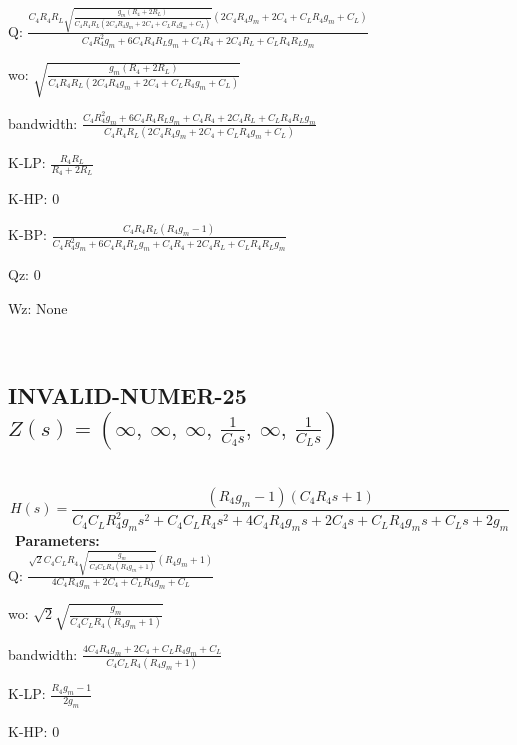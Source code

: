 \documentclass{article}
\begin{document}
Q: $\frac{C_{4} R_{4} R_{L} \sqrt{\frac{g_{m} \left(R_{4} + 2 R_{L}\right)}{C_{4} R_{4} R_{L} \left(2 C_{4} R_{4} g_{m} + 2 C_{4} + C_{L} R_{4} g_{m} + C_{L}\right)}} \left(2 C_{4} R_{4} g_{m} + 2 C_{4} + C_{L} R_{4} g_{m} + C_{L}\right)}{C_{4} R_{4}^{2} g_{m} + 6 C_{4} R_{4} R_{L} g_{m} + C_{4} R_{4} + 2 C_{4} R_{L} + C_{L} R_{4} R_{L} g_{m}}$\ 

wo: $\sqrt{\frac{g_{m} \left(R_{4} + 2 R_{L}\right)}{C_{4} R_{4} R_{L} \left(2 C_{4} R_{4} g_{m} + 2 C_{4} + C_{L} R_{4} g_{m} + C_{L}\right)}}$\ 

bandwidth: $\frac{C_{4} R_{4}^{2} g_{m} + 6 C_{4} R_{4} R_{L} g_{m} + C_{4} R_{4} + 2 C_{4} R_{L} + C_{L} R_{4} R_{L} g_{m}}{C_{4} R_{4} R_{L} \left(2 C_{4} R_{4} g_{m} + 2 C_{4} + C_{L} R_{4} g_{m} + C_{L}\right)}$\ 

K-LP: $\frac{R_{4} R_{L}}{R_{4} + 2 R_{L}}$\ 

K-HP: $0$\ 

K-BP: $\frac{C_{4} R_{4} R_{L} \left(R_{4} g_{m} - 1\right)}{C_{4} R_{4}^{2} g_{m} + 6 C_{4} R_{4} R_{L} g_{m} + C_{4} R_{4} + 2 C_{4} R_{L} + C_{L} R_{4} R_{L} g_{m}}$\ 

Qz: $0$\ 

Wz: $\text{None}$\ 

\ 

\subsection{INVALID-NUMER-25 $Z(s) = \left( \infty, \  \infty, \  \infty, \  \frac{1}{C_{4} s}, \  \infty, \  \frac{1}{C_{L} s}\right)$ } \ 
\textbf{\[H(s) = \frac{\left(R_{4} g_{m} - 1\right) \left(C_{4} R_{4} s + 1\right)}{C_{4} C_{L} R_{4}^{2} g_{m} s^{2} + C_{4} C_{L} R_{4} s^{2} + 4 C_{4} R_{4} g_{m} s + 2 C_{4} s + C_{L} R_{4} g_{m} s + C_{L} s + 2 g_{m}}\] } \ 
\textbf{Parameters:}\\ 

Q: $\frac{\sqrt{2} C_{4} C_{L} R_{4} \sqrt{\frac{g_{m}}{C_{4} C_{L} R_{4} \left(R_{4} g_{m} + 1\right)}} \left(R_{4} g_{m} + 1\right)}{4 C_{4} R_{4} g_{m} + 2 C_{4} + C_{L} R_{4} g_{m} + C_{L}}$\ 

wo: $\sqrt{2} \sqrt{\frac{g_{m}}{C_{4} C_{L} R_{4} \left(R_{4} g_{m} + 1\right)}}$\ 

bandwidth: $\frac{4 C_{4} R_{4} g_{m} + 2 C_{4} + C_{L} R_{4} g_{m} + C_{L}}{C_{4} C_{L} R_{4} \left(R_{4} g_{m} + 1\right)}$\ 

K-LP: $\frac{R_{4} g_{m} - 1}{2 g_{m}}$\ 

K-HP: $0$\ 
\end{document}
